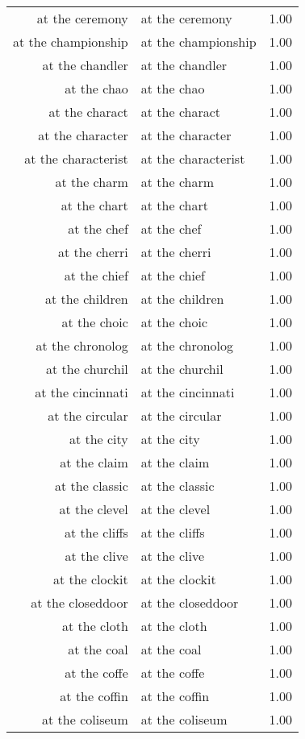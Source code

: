 \begin{table}[ht]
\begin{tabular}{rlr}
  at the ceremony & at the ceremony & 1.00 \\ 
  at the championship & at the championship & 1.00 \\ 
  at the chandler & at the chandler & 1.00 \\ 
  at the chao & at the chao & 1.00 \\ 
  at the charact & at the charact & 1.00 \\ 
  at the character & at the character & 1.00 \\ 
  at the characterist & at the characterist & 1.00 \\ 
  at the charm & at the charm & 1.00 \\ 
  at the chart & at the chart & 1.00 \\ 
  at the chef & at the chef & 1.00 \\ 
  at the cherri & at the cherri & 1.00 \\ 
  at the chief & at the chief & 1.00 \\ 
  at the children & at the children & 1.00 \\ 
  at the choic & at the choic & 1.00 \\ 
  at the chronolog & at the chronolog & 1.00 \\ 
  at the churchil & at the churchil & 1.00 \\ 
  at the cincinnati & at the cincinnati & 1.00 \\ 
  at the circular & at the circular & 1.00 \\ 
  at the city & at the city & 1.00 \\ 
  at the claim & at the claim & 1.00 \\ 
  at the classic & at the classic & 1.00 \\ 
  at the clevel & at the clevel & 1.00 \\ 
  at the cliffs & at the cliffs & 1.00 \\ 
  at the clive & at the clive & 1.00 \\ 
  at the clockit & at the clockit & 1.00 \\ 
  at the closeddoor & at the closeddoor & 1.00 \\ 
  at the cloth & at the cloth & 1.00 \\ 
  at the coal & at the coal & 1.00 \\ 
  at the coffe & at the coffe & 1.00 \\ 
  at the coffin & at the coffin & 1.00 \\ 
  at the coliseum & at the coliseum & 1.00 \\ 

\end{tabular}
\end{table}
